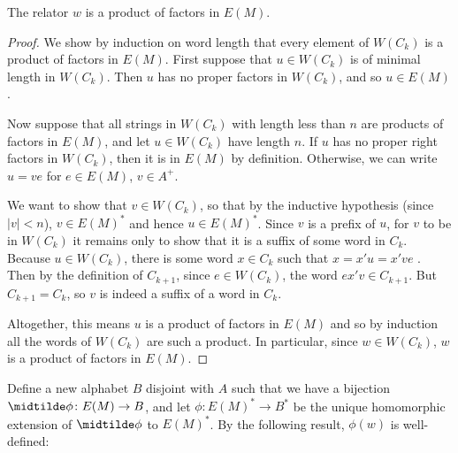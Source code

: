 \documentclass[noinsetproof,widepage,11pt,libertine]{lmaths}
\begin{document}
\begin{prop} \label{lma:relator-factors-E(M)}
	The relator $w$ is a product of factors in $E(M)$.
\end{prop}
\begin{proof}
	\vspace{-2\parskip}
	\hspace{-0.25mm}We show by induction on word length that every element of $W(C_k)$ is a product of factors in $E(M)$. First suppose that $u \in W(C_k)$ is of minimal length in $W(C_k)$. Then $u$ has no proper factors in $W(C_k)$, and so $u \in E(M)$.

	Now suppose that all strings in $W(C_k)$ with length less than $n$ are products of factors in $E(M)$, and let $u \in W(C_k)$ have length $n$. If $u$ has no proper right factors in $W(C_k)$, then it is in $E(M)$ by definition. Otherwise, we can write $u = ve$ for $e \in E(M)$, $v \in A^+$.

	We want to show that $v \in W(C_k)$, so that by the inductive hypothesis (since $|v| < n$), $v \in E(M)^*$ and hence $u \in E(M)^*$. Since $v$ is a prefix of $u$, for $v$ to be in $W(C_k)$ it remains only to show that it is a suffix of some word in $C_k$. Because $u \in W(C_k)$, there is some word $x \in C_k$ such that $x = x'u = x've$ . Then by the definition of $C_{k+1}$, since $e \in W(C_k)$, the word $ex'v \in C_{k+1}$. But $C_{k+1} = C_k$, so $v$ is indeed a suffix of a word in $C_k$.

	Altogether, this means $u$ is a product of factors in $E(M)$ and so by induction all the words of $W(C_k)$ are such a product. In particular, since $w \in W(C_k)$, $w$ is a product of factors in $E(M)$.
\end{proof}

\bigskip

Define a new alphabet $B$ disjoint with $A$ such that we have a bijection $\midtilde\phi \colon E(M) \to B$, and let $\phi \colon E(M)^* \to B^*$ be the unique homomorphic extension of $\midtilde\phi$ to $E(M)^*$. By the following result, $\phi(w)$ is well-defined:
\end{document}
